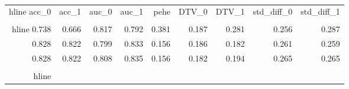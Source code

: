 \begin{table}[h]
\centering
\caption{}
\label{wd_para_4.0_wd_278.48052978515625}
\begin{tabular}{rrrrrrrrr}
\\hline
 acc\_0 &  acc\_1 &  auc\_0 &  auc\_1 &  pehe &  DTV\_0 &  DTV\_1 &  std\_diff\_0 &  std\_diff\_1 \\
\\hline
 0.738 &  0.666 &  0.817 &  0.792 & 0.381 &  0.187 &  0.281 &       0.256 &       0.287 \\
 0.828 &  0.822 &  0.799 &  0.833 & 0.156 &  0.186 &  0.182 &       0.261 &       0.259 \\
 0.828 &  0.822 &  0.808 &  0.835 & 0.156 &  0.182 &  0.194 &       0.265 &       0.265 \\
\\hline
\end{tabular}
\end{table}
